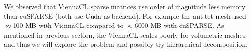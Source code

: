 \documentclass[11pt]{article}
\begin{document}
We observed that ViennaCL sparse matrices use order of magnitude less memory
than cuSPARSE (both use Cuda as backend). For example the ant tet mesh used
$\approx$100 MB with ViennaCL compared to $\approx$6000 MB with cuSPARSE.
As mentioned in previous section, the ViennaCL scales poorly for volumetric
meshes and thus we will explore the problem and possibly try hierarchical
decomposition.
\end{document}
